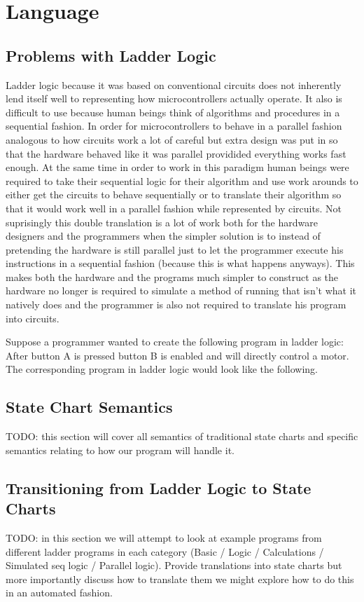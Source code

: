 \chapter{Language}
\section{Problems with Ladder Logic}
Ladder logic because it was based on conventional circuits does not inherently lend itself well to representing how microcontrollers actually operate. It also is difficult to use because human beings think of algorithms and procedures in a sequential fashion. In order for microcontrollers to behave in a parallel fashion analogous to how circuits work a lot of careful but extra design was put in so that the hardware behaved like it was parallel providided everything works fast enough. At the same time in order to work in this paradigm human beings were required to take their sequential logic for their algorithm and use work arounds to either get the circuits to behave sequentially or to translate their algorithm so that it would work well in a parallel fashion while represented by circuits. Not suprisingly this double translation is a lot of work both for the hardware designers and the programmers when the simpler solution is to instead of pretending the hardware is still parallel just to let the programmer execute his instructions in a sequential fashion (because this is what happens anyways). This makes both the hardware and the programs much simpler to construct as the hardware no longer is required to simulate a method of running that isn't what it natively does and the programmer is also not required to translate his program into circuits.

Suppose a programmer wanted to create the following program in ladder logic: After button A is pressed button B is enabled and will directly control a motor. The corresponding program in ladder logic would look like the following.


\section{State Chart Semantics}
TODO: this section will cover all semantics of traditional state charts and specific semantics relating to how our program will handle it.
\section{Transitioning from Ladder Logic to State Charts}
TODO: in this section we will attempt to look at example programs from different ladder programs in each category (Basic / Logic / Calculations / Simulated seq logic / Parallel logic). Provide translations into state charts but more importantly discuss how to translate them we might explore how to do this in an automated fashion.
